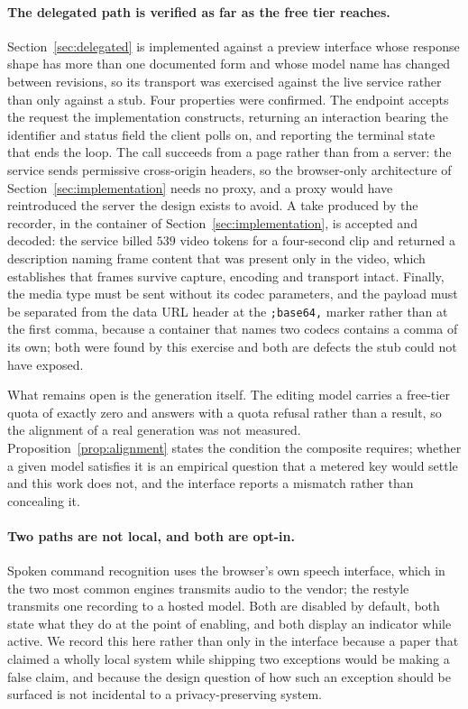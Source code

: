 \documentclass{article}
\theoremstyle{definition}
\begin{document}
\paragraph{The delegated path is verified as far as the free tier reaches.}
Section~\ref{sec:delegated} is implemented against a preview interface whose
response shape has more than one documented form and whose model name has changed
between revisions, so its transport was exercised against the live service rather
than only against a stub. Four properties were confirmed. The endpoint accepts
the request the implementation constructs, returning an interaction bearing the
identifier and status field the client polls on, and reporting the terminal state
that ends the loop. The call succeeds from a page rather than from a server: the
service sends permissive cross-origin headers, so the browser-only architecture
of Section~\ref{sec:implementation} needs no proxy, and a proxy would have
reintroduced the server the design exists to avoid. A take produced by the
recorder, in the container of Section~\ref{sec:implementation}, is accepted and
decoded: the service billed $539$ video tokens for a four-second clip and
returned a description naming frame content that was present only in the video,
which establishes that frames survive capture, encoding and transport intact.
Finally, the media type must be sent without its codec parameters, and the
payload must be separated from the data URL header at the \texttt{;base64,}
marker rather than at the first comma, because a container that names two codecs
contains a comma of its own; both were found by this exercise and both are
defects the stub could not have exposed.

What remains open is the generation itself. The editing model carries a free-tier
quota of exactly zero and answers with a quota refusal rather than a result, so
the alignment of a real generation was not measured.
Proposition~\ref{prop:alignment} states the condition the composite requires;
whether a given model satisfies it is an empirical question that a metered key
would settle and this work does not, and the interface reports a mismatch rather
than concealing it.

\paragraph{Two paths are not local, and both are opt-in.}
Spoken command recognition uses the browser's own speech interface, which in the
two most common engines transmits audio to the vendor; the restyle transmits one
recording to a hosted model. Both are disabled by default, both state what they
do at the point of enabling, and both display an indicator while active. We
record this here rather than only in the interface because a paper that claimed a
wholly local system while shipping two exceptions would be making a false claim,
and because the design question of how such an exception should be surfaced is
not incidental to a privacy-preserving system.
\end{document}
